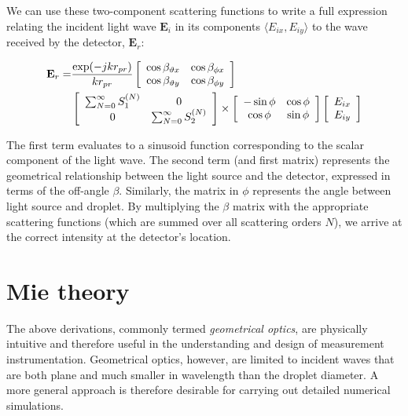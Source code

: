 \documentclass[11.5pt,oneside]{book}
\begin{document}
We can use these two-component scattering functions to write a full expression
relating the incident light wave $\mathbf{E}_i$ in its components $\langle E_{ix},
E_{iy} \rangle$ to the wave received by the detector, $\mathbf{E}_r$:

\begin{equation}
  \begin{split}
    \label{eq:fulltransfer}
    {\bf E}_r = &\frac{\exp(-j k r_{pr})}{k r_{pr}}
    \left[ \begin{array}{c c}\cos \beta_{\vartheta x} & \cos \beta_{\phi x} \\
            \cos \beta_{\vartheta y} & \cos \beta_{\phi y} \end{array} \right]
    \\
    &\left[ \begin{array}{c c} \sum_{N=0}^{\infty} S_1^{(N)} & 0 \\
    0 & \sum_{N=0}^{\infty} S_2^{(N)}
  \end{array} \right] \times
\left[ \begin{array}{c c} -\sin \phi & \cos \phi \\ \cos \phi & \sin \phi \end{array} \right]
\left[ \begin{array}{c} E_{ix} \\ E_{iy} \end{array} \right]
\end{split}
\end{equation}

The first term evaluates to a sinusoid function corresponding to the scalar
component of the light wave. The second term (and first matrix) represents the
geometrical relationship between the light source and the detector, expressed in
terms of the off-angle $\beta$. Similarly, the matrix in $\phi$ represents the
angle between light source and droplet. By multiplying the $\beta$ matrix with
the appropriate scattering functions (which are summed over all scattering
orders $N$), we arrive at the correct intensity at the detector's location.

\section{Mie theory \label{sec:mietheory}}
The above derivations, commonly termed \emph{geometrical
optics}, are physically intuitive and therefore useful in the understanding and
design of measurement instrumentation. Geometrical optics, however, are limited
to incident waves that are both plane and much smaller in wavelength than the
droplet diameter. A more general approach is therefore desirable for carrying
out detailed numerical simulations.
\end{document}
